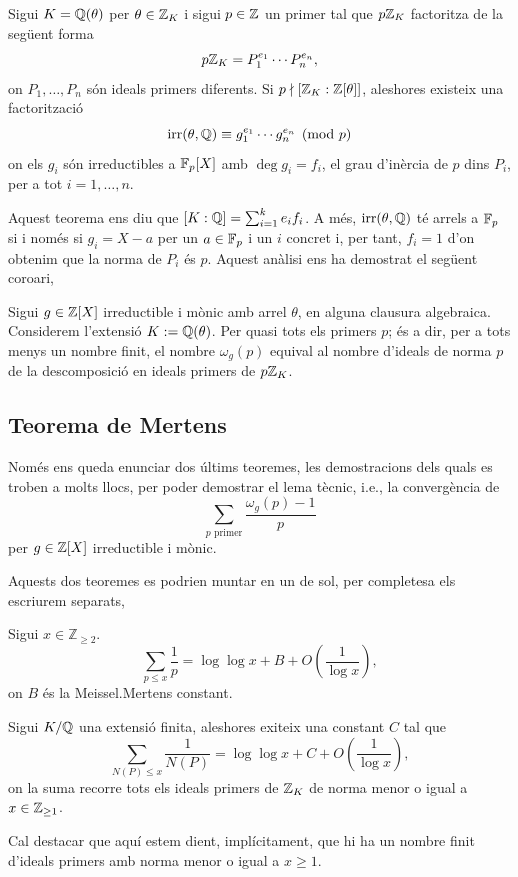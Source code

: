 \begin{thm}
    Sigui $K=\mathbb{Q}(\theta)$ per $\theta\in\mathbb{Z}_K$ i sigui $p\in \mathbb{Z}$ un primer tal que $p\mathbb{Z}_K$ factoritza de la següent forma
    \[
    p\mathbb{Z}_K=P_1^{e_1}\cdots P_n^{e_n},
    \]
    on $P_1,\ldots, P_n$ són ideals primers diferents. Si $p\nmid [\mathbb{Z}_K:\mathbb{Z}[\theta]]$, aleshores existeix una factorització 
    \[
    \operatorname{irr}(\theta, \mathbb{Q})\equiv g_1^{e_1}\cdots g_n^{e_n}\pmod{p}
    \]
    on els $g_i$ són irreductibles a $\mathbb{F}_p[X]$ amb $\deg g_i=f_i$, el grau d'inèrcia de $p$ dins $P_i$, per a tot $i=1,\ldots, n$.
\end{thm}
Aquest teorema ens diu que $[K:\mathbb{Q}]=\sum_{i=1}^ke_if_i$. A més, $\operatorname{irr}(\theta, \mathbb{Q})$ té arrels a $\mathbb{F}_p$ si i només si $g_i=X-a$ per un $a\in \mathbb{F}_p$ i un $i$ concret i, per tant, $f_i=1$ d'on obtenim que la norma de $P_i$ és $p$. Aquest anàlisi ens ha demostrat el següent coro\lgem ari,
\begin{coro}\label{coro}
Sigui $g\in \mathbb{Z}[X]$ irreductible i mònic amb arrel $\theta$, en alguna clausura algebraica. Considerem l'extensió $K:=\mathbb{Q}(\theta)$. Per quasi tots els primers $p$; és a dir, per a tots menys un nombre finit, el nombre $\omega_g(p)$ equival al nombre d'ideals de norma $p$ de la descomposició en ideals primers de $p\mathbb{Z}_K$.  
\end{coro}

\subsection{Teorema de Mertens}

Només ens queda enunciar dos últims teoremes, les demostracions dels quals es troben a molts llocs, per poder demostrar el lema tècnic, i.e., la convergència de 
\[
\sum_{p\text{ primer}}\frac{\omega_g(p)-1}{p}
\]
per $g\in\mathbb{Z}[X]$ irreductible i mònic.

Aquests dos teoremes es podrien muntar en un de sol, per completesa els escriurem separats,
\begin{thm}[de Mertens]
Sigui $x\in\mathbb Z_{\geq 2}$.
    \[
    \sum_{p\leq x}\frac{1}{p}=\log\log x+B+O\left(\frac{1}{\log x}\right),
    \]
    on $B$ és la Meissel.Mertens constant.
\end{thm}
\begin{thm}
    Sigui $K/\mathbb{Q}$ una extensió finita, aleshores exiteix una constant $C$ tal que 
    \[
    \sum_{N(P)\leq x}\frac{1}{N(P)}=\log\log x+C+O\left(\frac{1}{\log x}\right),
    \]
    on la suma recorre tots els ideals primers de $\mathbb{Z}_K$ de norma menor o igual a $x\in\mathbb{Z}_{\geq 1}$.
\end{thm}
Cal destacar que aquí estem dient, implícitament, que hi ha un nombre finit d'ideals primers amb norma menor o igual a $x\geq 1$.

